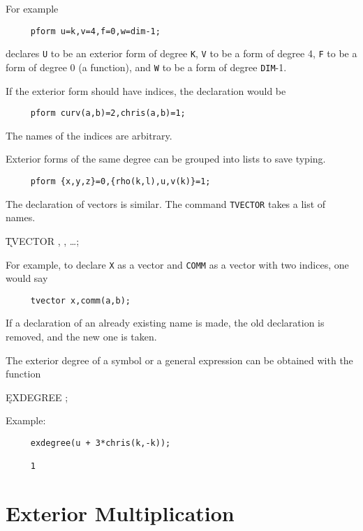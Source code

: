 For example

\begin{verbatim}
     pform u=k,v=4,f=0,w=dim-1;
\end{verbatim}

declares {\tt U} to be an exterior form of degree {\tt K}, {\tt V} to be a
form of degree 4, {\tt F} to be a form of degree 0 (a function), and {\tt W}
to be a form of degree {\tt DIM}-1.

If the exterior form should have indices, the declaration would be

\begin{verbatim}
     pform curv(a,b)=2,chris(a,b)=1;
\end{verbatim}

The names of the indices are arbitrary.

Exterior forms of the same degree can be grouped into lists to save typing.

\begin{verbatim}
     pform {x,y,z}=0,{rho(k,l),u,v(k)}=1;
\end{verbatim}

The declaration of vectors is similar. The command {\tt TVECTOR}\label{TVECTOR}
takes a list of names.  

\hspace*{2em} \k{TVECTOR} , , \ldots;

For example, to declare {\tt X} as a vector and {\tt COMM} as a vector with
two indices, one would say

\begin{verbatim}
     tvector x,comm(a,b);
\end{verbatim}

If a declaration of an already existing name is made, the old
declaration is removed, and the new one is taken.

The exterior degree of a symbol or a general expression can be obtained
with the function \label{EXDEGREE} 

\hspace*{2em} \k{EXDEGREE} ;

Example:
\begin{verbatim}
     exdegree(u + 3*chris(k,-k));

     1
\end{verbatim}


\section{Exterior Multiplication}

